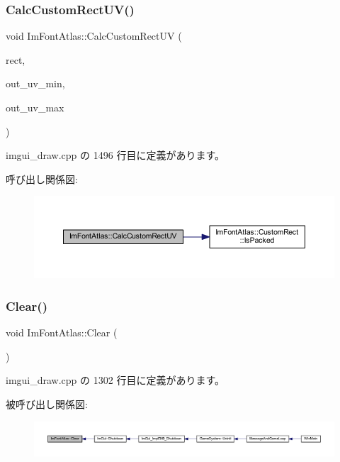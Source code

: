 \subsubsection{\texorpdfstring{Calc\+Custom\+Rect\+U\+V()}{CalcCustomRectUV()}}
{\footnotesize\ttfamily void Im\+Font\+Atlas\+::\+Calc\+Custom\+Rect\+UV (\begin{DoxyParamCaption}\item[{const \mbox{\hyperlink{struct_im_font_atlas_1_1_custom_rect}{Custom\+Rect}} $\ast$}]{rect,  }\item[{\mbox{\hyperlink{struct_im_vec2}{Im\+Vec2}} $\ast$}]{out\+\_\+uv\+\_\+min,  }\item[{\mbox{\hyperlink{struct_im_vec2}{Im\+Vec2}} $\ast$}]{out\+\_\+uv\+\_\+max }\end{DoxyParamCaption})}



 imgui\+\_\+draw.\+cpp の 1496 行目に定義があります。

呼び出し関係図\+:\nopagebreak
\begin{figure}[H]
\begin{center}
\leavevmode
\includegraphics[width=350pt]{struct_im_font_atlas_a70e062104b11a213eb3d177151c418e2_cgraph}
\end{center}
\end{figure}
\mbox{\label{struct_im_font_atlas_a8f6d01c671d8670f991ba651bbaf7e77}} 
\subsubsection{\texorpdfstring{Clear()}{Clear()}}
{\footnotesize\ttfamily void Im\+Font\+Atlas\+::\+Clear (\begin{DoxyParamCaption}{ }\end{DoxyParamCaption})}



 imgui\+\_\+draw.\+cpp の 1302 行目に定義があります。

被呼び出し関係図\+:\nopagebreak
\begin{figure}[H]
\begin{center}
\leavevmode
\includegraphics[width=350pt]{struct_im_font_atlas_a8f6d01c671d8670f991ba651bbaf7e77_icgraph}
\end{center}
\end{figure}
\mbox{\label{struct_im_font_atlas_ad5c2560d708bd0c389e9bd9da2d9b055}} 
